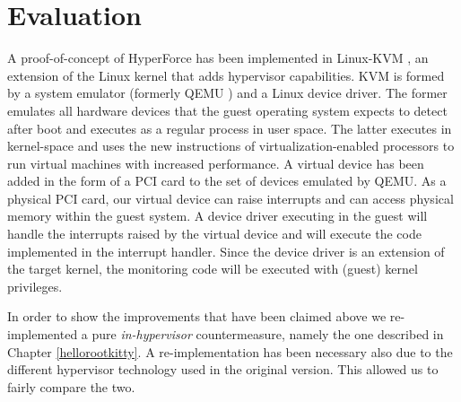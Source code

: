 \section{Evaluation}\label{hf:evaluation}
A proof-of-concept of HyperForce has been implemented in Linux-KVM \cite{kvm}, an extension of the Linux kernel that adds hypervisor capabilities. KVM is formed by a system emulator (formerly QEMU \cite{qemu}) and a Linux device driver.
The former emulates all hardware devices that the guest operating system expects to detect after boot and executes as a regular process in user space. The latter executes in kernel-space and uses the new instructions of virtualization-enabled processors to run virtual machines with increased performance.
A virtual device has been added in the form of a PCI card to the set of devices emulated by QEMU. As a physical PCI card, our virtual device can raise interrupts and can access physical memory within the guest system. 
A device driver executing in the guest will handle the interrupts raised by the virtual device and will execute the code implemented in the interrupt handler. Since the device driver is an extension of the target kernel, the monitoring code will be executed with (guest) kernel privileges.

In order to show the improvements that have been claimed above we re-implemented a pure \textit{in-hypervisor} countermeasure, namely the one described in Chapter \ref{hellorootkitty}.
A re-implementation has been necessary also due to the different hypervisor technology used in the original version. This allowed us to fairly compare the two.

